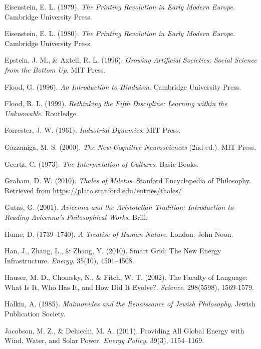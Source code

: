 \documentclass[twocolumn]{article}
\begin{document}
\begin{thebibliography}{99}
Eisenstein, E. L. (1979). \textit{The Printing Revolution in Early Modern Europe}. Cambridge University Press.

Eisenstein, E. L. (1980). \textit{The Printing Revolution in Early Modern Europe}. Cambridge University Press.

Epstein, J. M., \& Axtell, R. L. (1996). \textit{Growing Artificial Societies: Social Science from the Bottom Up}. MIT Press.

Flood, G. (1996). \textit{An Introduction to Hinduism}. Cambridge University Press.

Flood, R. L. (1999). \textit{Rethinking the Fifth Discipline: Learning within the Unknowable}. Routledge.

Forrester, J. W. (1961). \textit{Industrial Dynamics}. MIT Press.

Gazzaniga, M. S. (2000). \textit{The New Cognitive Neurosciences} (2nd ed.). MIT Press.

Geertz, C. (1973). \textit{The Interpretation of Cultures}. Basic Books.

Graham, D. W. (2010). \textit{Thales of Miletus}. Stanford Encyclopedia of Philosophy. Retrieved from \url{https://plato.stanford.edu/entries/thales/}

Gutas, G. (2001). \textit{Avicenna and the Aristotelian Tradition: Introduction to Reading Avicenna's Philosophical Works}. Brill.

Hume, D. (1739–1740). \textit{A Treatise of Human Nature}. London: John Noon.

Han, J., Zhang, L., \& Zhang, Y. (2010). Smart Grid: The New Energy Infrastructure. \textit{Energy}, 35(10), 4501–4508.

Hauser, M. D., Chomsky, N., \& Fitch, W. T. (2002). The Faculty of Language: What Is It, Who Has It, and How Did It Evolve?. \textit{Science}, 298(5598), 1569-1579.

Halkin, A. (1985). \textit{Maimonides and the Renaissance of Jewish Philosophy}. Jewish Publication Society.

Jacobson, M. Z., \& Delucchi, M. A. (2011). Providing All Global Energy with Wind, Water, and Solar Power. \textit{Energy Policy}, 39(3), 1154–1169.


\end{thebibliography}
\end{document}
